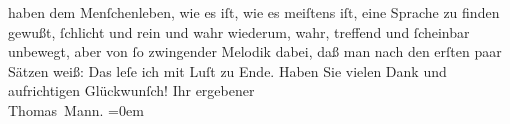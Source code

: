 \begin{ledgroupsized}[t]{13cm}
                    haben dem Menſchenleben, wie es iſt, wie es meiſtens iſt, eine Sprache zu finden
                    gewußt, ſchlicht und rein und wahr wiederum, wahr, treffend und ſcheinbar
                    unbewegt, aber von ſo zwingender Melodik dabei, daß man nach den erſten paar
                    Sätzen weiß: Das leſe ich mit Luſt zu Ende. Haben Sie vielen Dank und
                    aufrichtigen Glückwunſch!\pend
           \pstart
           Ihr ergebener{\\[\baselineskip]}\spacefill\mbox{Thomas Mann.}\pend
           \leftskip=0em{}          \endnumbering{}\end{ledgroupsized}  \newcommand{\dateiname}{L02501}\newcommand{\titel}{Thomas Mann an Arthur Schnitzler, 28. 5. 1928}\newcommand{\editorInnen}{Martin Anton Müller und Gerd-Hermann Susen}
      